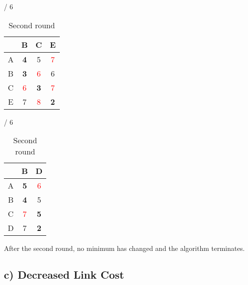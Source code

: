 \documentclass[a4paper, 11 pt, article, accentcolor=tud7b]{tudreport}
\begin{document}
\begin{table}[h]
    \hfill
	  \begin{subtable}[b]{\textwidth / 6}
	    \begin{tabular}{| c | c | c | c |}
	    \hline
	      & B                   & C                  & E                  \\ \hline
	    A & \textbf{4}          & 5                  & \textcolor{red}{7} \\ \hline
	    B & \textbf{3}          & \textcolor{red}{6} & 6                  \\ \hline
	    C & \textcolor{red}{6}  & \textbf{3}         & \textcolor{red}{7} \\ \hline
	    E & 7                   & \textcolor{red}{8} & \textbf{2}         \\ \hline
	    \end{tabular}
	    \caption{$D^{D}$}
	  \end{subtable}
	  \hfill
	  \begin{subtable}[b]{\textwidth / 6}
	    \begin{tabular}{| c | c | c |}
	    \hline
	      & B                   & D                    \\ \hline
	    A & \textbf{5}          & \textcolor{red}{6}   \\ \hline
	    B & \textbf{4}          & 5                    \\ \hline
	    C & \textcolor{red}{7}  & \textbf{5}           \\ \hline
	    D & 7                   & \textbf{2}           \\ \hline
	    \end{tabular}
	    \caption{$D^{E}$}
	  \end{subtable}
	  \caption{Second round}
	\end{table}
	
	After the second round, no minimum has changed and the algorithm terminates.
	
	\newpage
	
	\subsection*{c) Decreased Link Cost}
	
\end{document}
